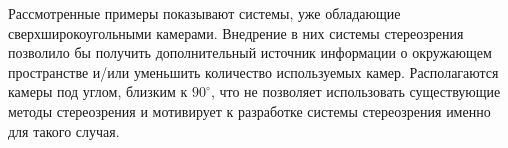 
Рассмотренные примеры показывают системы, уже обладающие сверхширокоугольными камерами. Внедрение в них системы стереозрения 
позволило бы получить дополнительный источник информации о окружающем пространстве и/или уменьшить количество используемых камер. 
Располагаются камеры под углом, близким к $90^\circ$, что не позволяет использовать существующие методы стереозрения и 
мотивирует к разработке системы стереозрения именно для такого случая. 